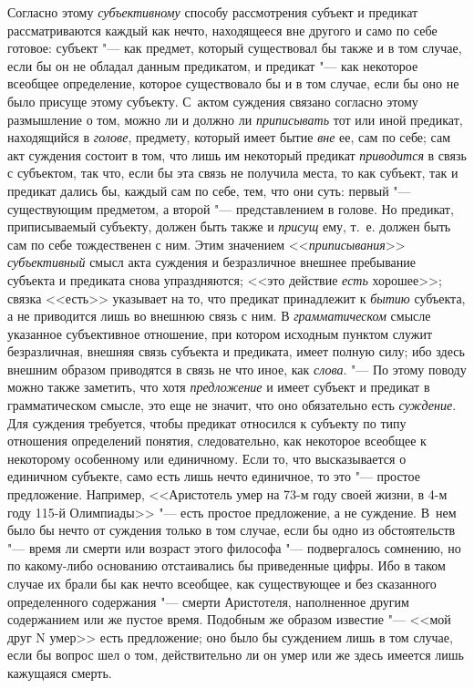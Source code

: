 {Согласно этому
{\em субъективному}
способу рассмотрения субъект и предикат рассматриваются
каждый как нечто, находящееся вне другого и само по себе готовое: субъект
"--- как предмет, который существовал бы также и в том случае,
если бы он не обладал данным предикатом, и предикат "--- как
некоторое всеобщее определение, которое существовало бы и в том случае,
если бы оно не было присуще этому субъекту. С~актом суждения связано
согласно этому размышление о том, можно ли и должно ли
{\em приписывать} тот или
иной предикат, находящийся в
{\em голове}, предмету,
который имеет бытие {\em вне}
ее, сам по себе; сам акт суждения состоит в том, что лишь им
некоторый предикат {\em приводится}
в связь с субъектом, так что, если бы эта связь не получила
места, то как субъект, так и предикат дались бы, каждый сам по себе, тем,
что они суть: первый "--- существующим предметом, а второй
"--- представлением в голове. Но предикат, приписываемый
субъекту, должен быть также и
{\em присущ} ему, т.~е.
должен быть сам по себе тождественен с ним. Этим значением
<<{\em приписывания}>>
{\em субъективный} смысл
акта суждения и безразличное внешнее пребывание субъекта и предиката снова
упраздняются; <<это действие {\em есть}
хорошее>>; связка <<есть>> указывает на то, что предикат
принадлежит к {\em бытию}
субъекта, а не приводится лишь во внешнюю связь с ним. В
{\em грамматическом}
смысле указанное субъективное отношение, при котором исходным
пунктом служит безразличная, внешняя связь субъекта и предиката, имеет
полную силу; ибо здесь внешним образом приводятся в связь не что иное, как
{\em слова}. "--- По этому
поводу можно также заметить, что хотя
{\em предложение} и имеет
субъект и предикат в грамматическом смысле, это еще не значит, что оно
обязательно есть {\em суждение}.
Для суждения требуется, чтобы предикат относился к субъекту
по типу отношения определений понятия, следовательно, как некоторое
всеобщее к некоторому особенному или единичному. Если то,
что высказывается о единичном субъекте, само есть лишь нечто единичное, то
это "--- простое предложение. Например, <<Аристотель умер на
73-м году своей
жизни,
в 4-м году 115-й Олимпиады>> "--- есть простое
предложение, а не суждение. В~нем было бы нечто от суждения только в том
случае, если бы одно из обстоятельств "--- время ли смерти или
возраст этого философа "--- подвергалось сомнению, но по
какому-либо основанию отстаивались бы приведенные цифры. Ибо в таком случае
их брали бы как нечто всеобщее, как существующее и без сказанного
определенного содержания "--- смерти Аристотеля, наполненное
другим содержанием или же пустое время. Подобным же образом известие
"--- <<мой друг N умер>> есть предложение; оно было бы суждением
лишь в том случае, если бы вопрос шел о том, действительно ли он умер или
же здесь имеется лишь кажущаяся смерть.

}
